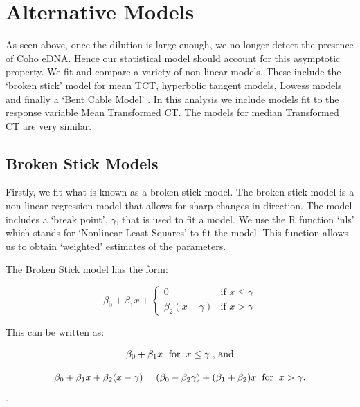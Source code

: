 \section{Alternative Models}



As seen above, once the dilution is large enough, we no longer detect the presence of Coho eDNA. Hence our statistical model should account for this asymptotic property. We fit and compare a variety of  non-linear models. These include the `broken stick' model for mean TCT, hyperbolic tangent models, Lowess models and finally a `Bent Cable Model' \citep{piecewiseregression}. In this analysis we include models fit to the response variable Mean Transformed CT. The models for median Transformed CT are very similar.

\subsection{Broken Stick Models}

Firstly, we fit what is known as a broken stick model. The broken stick model is a non-linear regression model that allows for sharp changes in direction.
The model includes a `break point', $\gamma$, that is used to fit a model. We use the R function `nls' \citep{nlsTools} which stands for `Nonlinear Least Squares' to fit the model. This function allows us to obtain `weighted' estimates of the parameters.

\vspace{3mm}

The Broken Stick model has the form:

\vspace{3mm}

 $$ \beta_{0}+\beta_{1}x+ \begin{cases}
0  &  \text{if    } x \le \gamma \\[2ex]
\beta_{2}(x-\gamma)  & \text{if    } x > \gamma
\end{cases}$$


This can be written as:

$$\beta_{0}+\beta_{1}x \hspace{1mm} \mbox{ for} \hspace{2mm} x \le \gamma \hspace{1mm} \mbox{, and}$$


$$\beta_{0}+\beta_{1}x+\beta_{2}(x-\gamma)=(\beta_{0}-\beta_{2}\gamma)+(\beta_{1}+\beta_{2})x \hspace{2mm} \mbox{for} \hspace{2mm}  x > \gamma \mbox{.} $$.


